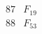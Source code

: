 \documentclass{article}
\begin{document}
{$$\begin{array}{|r|*{7}{r|}}
 & 
 & 
 & 
 & 
\\
\hline
87 
 & F_{19} &
 & 
 & 
 & 
 & 
 & 
\\
\hline
88 
 & F_{53} &
 & 
 & 
 & 
 & 
 & 

\end{array}$$}
\end{document}
